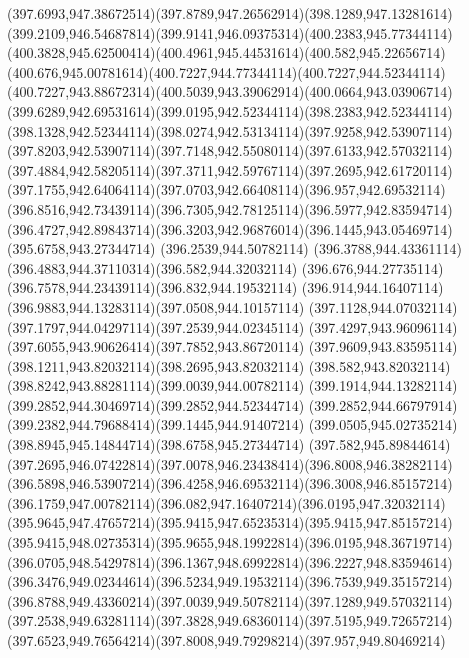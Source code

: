{{	\curveto(397.6993,947.38672514)(397.8789,947.26562914)(398.1289,947.13281614)
	\curveto(399.2109,946.54687814)(399.9141,946.09375314)(400.2383,945.77344114)
	\curveto(400.3828,945.62500414)(400.4961,945.44531614)(400.582,945.22656714)
	\curveto(400.676,945.00781614)(400.7227,944.77344114)(400.7227,944.52344114)
	\curveto(400.7227,943.88672314)(400.5039,943.39062914)(400.0664,943.03906714)
	\curveto(399.6289,942.69531614)(399.0195,942.52344114)(398.2383,942.52344114)
	\curveto(398.1328,942.52344114)(398.0274,942.53134114)(397.9258,942.53907114)
	\curveto(397.8203,942.53907114)(397.7148,942.55080114)(397.6133,942.57032114)
	\curveto(397.4884,942.58205114)(397.3711,942.59767114)(397.2695,942.61720114)
	\curveto(397.1755,942.64064114)(397.0703,942.66408114)(396.957,942.69532114)
	\curveto(396.8516,942.73439114)(396.7305,942.78125114)(396.5977,942.83594714)
	\curveto(396.4727,942.89843714)(396.3203,942.96876014)(396.1445,943.05469714)
	\lineto(395.6758,943.27344714)
	\lineto(396.2539,944.50782114)
	\curveto(396.3788,944.43361114)(396.4883,944.37110314)(396.582,944.32032114)
	\curveto(396.676,944.27735114)(396.7578,944.23439114)(396.832,944.19532114)
	\curveto(396.914,944.16407114)(396.9883,944.13283114)(397.0508,944.10157114)
	\curveto(397.1128,944.07032114)(397.1797,944.04297114)(397.2539,944.02345114)
	\curveto(397.4297,943.96096114)(397.6055,943.90626414)(397.7852,943.86720114)
	\curveto(397.9609,943.83595114)(398.1211,943.82032114)(398.2695,943.82032114)
	\curveto(398.582,943.82032114)(398.8242,943.88281114)(399.0039,944.00782114)
	\curveto(399.1914,944.13282114)(399.2852,944.30469714)(399.2852,944.52344714)
	\curveto(399.2852,944.66797914)(399.2382,944.79688414)(399.1445,944.91407214)
	\curveto(399.0505,945.02735214)(398.8945,945.14844714)(398.6758,945.27344714)
	\lineto(397.582,945.89844614)
	\curveto(397.2695,946.07422814)(397.0078,946.23438414)(396.8008,946.38282114)
	\curveto(396.5898,946.53907214)(396.4258,946.69532114)(396.3008,946.85157214)
	\curveto(396.1759,947.00782114)(396.082,947.16407214)(396.0195,947.32032114)
	\curveto(395.9645,947.47657214)(395.9415,947.65235314)(395.9415,947.85157214)
	\curveto(395.9415,948.02735314)(395.9655,948.19922814)(396.0195,948.36719714)
	\curveto(396.0705,948.54297814)(396.1367,948.69922814)(396.2227,948.83594614)
	\curveto(396.3476,949.02344614)(396.5234,949.19532114)(396.7539,949.35157214)
	\curveto(396.8788,949.43360214)(397.0039,949.50782114)(397.1289,949.57032114)
	\curveto(397.2538,949.63281114)(397.3828,949.68360114)(397.5195,949.72657214)
	\curveto(397.6523,949.76564214)(397.8008,949.79298214)(397.957,949.80469214)
}}
